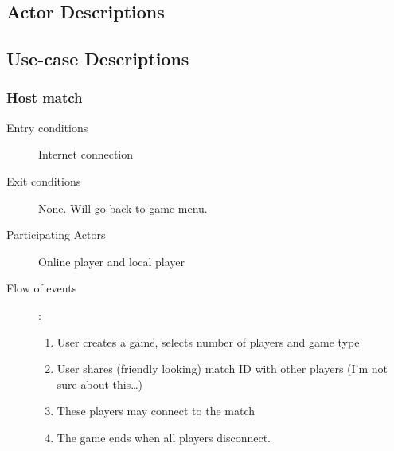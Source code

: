 \documentclass[12pt]{article}
\begin{document}
\subsection{Actor Descriptions}

\subsection{Use-case Descriptions}

    \subsubsection{Host match}
    \begin{description}
        \item[Entry conditions] Internet connection
        \item[Exit conditions] None. Will go back to game menu.
        \item[Participating Actors] Online player and local player
        \item[Flow of events]:
            \begin{enumerate}
                \item User creates a game, selects number of players and game
                    type
                \item User shares (friendly looking) match ID with other
                    players (I’m not sure about this…)
                \item These players may connect to the match
                \item The game ends when all players disconnect.
            \end{enumerate}
    \end{description}

\end{document}
